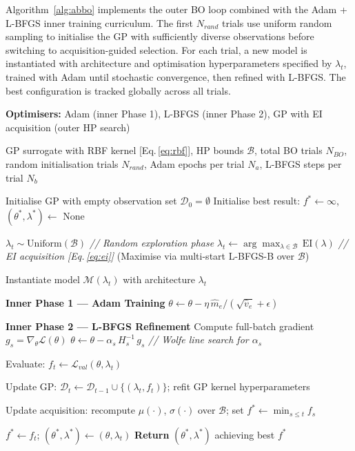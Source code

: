 \documentclass[12pt,a4paper]{article}
\begin{document}
Algorithm~\ref{alg:abbo} implements the outer BO loop combined with
the Adam + L-BFGS inner training curriculum.  The first $N_{rand}$
trials use uniform random sampling to initialise the GP with
sufficiently diverse observations before switching to acquisition-guided
selection.  For each trial, a new model is instantiated with
architecture and optimisation hyperparameters specified by $\lambda_t$,
trained with Adam until stochastic convergence, then refined with
L-BFGS.  The best configuration is tracked globally across all trials.

\begin{algorithm}[tb]
\caption{Method B — Hybrid ABBO}
\label{alg:abbo}
\textbf{Optimisers:} Adam (inner Phase 1), L-BFGS (inner Phase 2),
GP with EI acquisition (outer HP search)
\begin{algorithmic}[1]
\Require GP surrogate with RBF kernel [Eq.\,\eqref{eq:rbf}],
         HP bounds $\mathcal{B}$,
         total BO trials $N_{BO}$,
         random initialisation trials $N_{rand}$,
         Adam epochs per trial $N_a$,
         L-BFGS steps per trial $N_b$

\State Initialise GP with empty observation set $\mathcal{D}_0 = \emptyset$
\State Initialise best result: $f^* \leftarrow \infty$,
       $(\theta^*, \lambda^*) \leftarrow$ None

    \State $\lambda_t \sim \mathrm{Uniform}(\mathcal{B})$
           \hfill \textit{// Random exploration phase}
  \Else
    \State $\lambda_t \leftarrow \arg\max_{\lambda \in \mathcal{B}}\,\mathrm{EI}(\lambda)$
           \hfill \textit{// EI acquisition [Eq.\,\eqref{eq:ei}]}
    \State (Maximise via multi-start L-BFGS-B over $\mathcal{B}$)
  \EndIf

  \State Instantiate model $\mathcal{M}(\lambda_t)$ with architecture $\lambda_t$

  \State \textbf{Inner Phase 1 — Adam Training}
    \State $\theta \leftarrow \theta - \eta\,\hat{m}_e / (\sqrt{\hat{v}_e}+\epsilon)$
  \EndFor

  \State \textbf{Inner Phase 2 — L-BFGS Refinement}
    \State Compute full-batch gradient $g_s = \nabla_\theta\mathcal{L}(\theta)$
    \State $\theta \leftarrow \theta - \alpha_s\,H_s^{-1}\,g_s$
           \hfill \textit{// Wolfe line search for $\alpha_s$}
  \EndFor

  \State Evaluate: $f_t \leftarrow \mathcal{L}_{val}(\theta, \lambda_t)$

  \State Update GP: $\mathcal{D}_t \leftarrow \mathcal{D}_{t-1} \cup \{(\lambda_t, f_t)\}$;
         refit GP kernel hyperparameters

  \State Update acquisition: recompute $\mu(\cdot)$, $\sigma(\cdot)$
         over $\mathcal{B}$; set $f^* \leftarrow \min_{s \le t} f_s$

    \State $f^* \leftarrow f_t$;
           $(\theta^*, \lambda^*) \leftarrow (\theta, \lambda_t)$
  \EndIf
\EndFor
\State \textbf{Return} $(\theta^*, \lambda^*)$ achieving best $f^*$
\end{algorithmic}
\end{algorithm}
\end{document}
